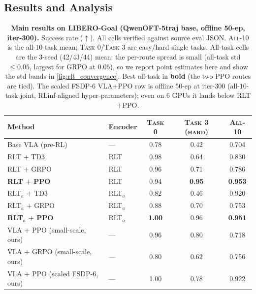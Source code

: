 \documentclass[11pt]{article}
\begin{document}
\subsection{Results and Analysis}
\label{sec:rlt_results}

\begin{table}[t]
    \centering
    \caption{\textbf{Main results on LIBERO-Goal (QwenOFT-5traj base, offline 50-ep, iter-300).} Success rate ($\uparrow$). All cells verified against source eval JSON. \textsc{All-10} is the all-$10$-task mean; \textsc{Task 0}/\textsc{Task 3} are easy/hard single tasks. All-task cells are the $3$-seed (42/43/44) mean; the per-route spread is small (all-task std $\le 0.05$, largest for GRPO at $0.05$), so we report point estimates here and show the std bands in \cref{fig:rlt_convergence}. Best all-task in \textbf{bold} (the two PPO routes are tied). The scaled FSDP-$6$ VLA$+$PPO row is offline 50-ep at iter-$300$ (all-$10$-task joint, RLinf-aligned hyper-parameters); even on $6$ GPUs it lands below RLT$+$PPO.}
    \label{tab:rlt_main}
    \vspace{0.3em}
    \footnotesize
    \setlength{\tabcolsep}{6pt}
    \renewcommand{\arraystretch}{1.18}
    \begin{tabular}{@{}l l ccc@{}}
        \toprule
        \textbf{Method} & \textbf{Encoder} & \textsc{Task 0} & \textsc{Task 3 (hard)} & \textsc{All-10} \\
        \midrule
        \rowcolor{abMist} Base VLA (pre-RL) & ---     & 0.78 & 0.42 & 0.704 \\
        RLT $+$ TD3       & RLT    & 0.98 & 0.64           & 0.830 \\
        RLT $+$ GRPO      & RLT    & 0.96 & 0.71 & 0.786 \\
        \textbf{RLT $+$ PPO} & RLT & 0.94 & \textbf{0.95} & \textbf{0.953} \\
        RLT$_a$ $+$ TD3   & RLT$_a$& 0.82 & 0.46           & 0.920 \\
        RLT$_a$ $+$ GRPO  & RLT$_a$& 0.88 & 0.70           & 0.753 \\
        \textbf{RLT$_a$ $+$ PPO} & RLT$_a$ & \textbf{1.00} & 0.96 & \textbf{0.951} \\
        \midrule
        VLA $+$ PPO (small-scale, ours)  & --- & 0.96 & 0.80 & 0.718 \\
        VLA $+$ GRPO (small-scale, ours) & --- & 0.80 & 0.62 & 0.756 \\
        VLA $+$ PPO (scaled FSDP-6, ours) & --- & 1.00 & 0.78 & 0.922 \\
        \bottomrule
    \end{tabular}
\end{table}
\end{document}
